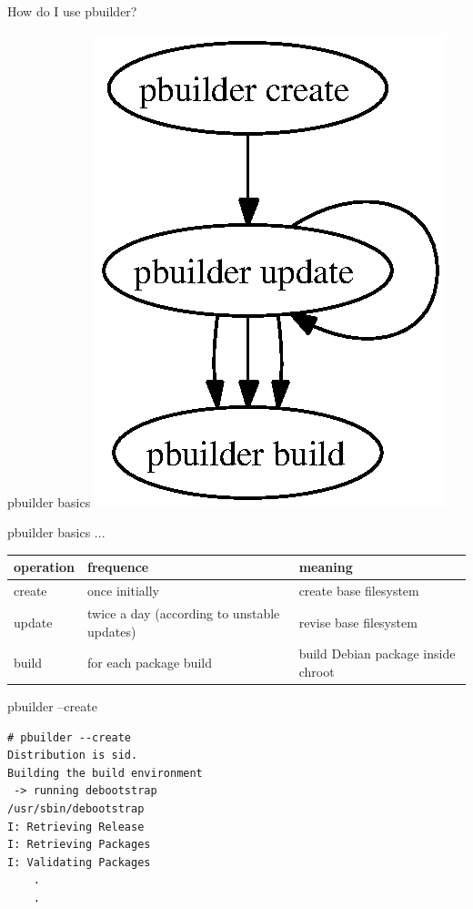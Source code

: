 \documentclass[dvipdfm,12pt,times]{beamer}
\newcommand{\emtext}[1]{
\begin{frame}{}
 
{\Huge #1
}
\end{frame}
}
\begin{document}
\emtext{How do I use pbuilder?}

\begin{frame}{pbuilder basics}
\includegraphics[height=0.7\vsize]{pbuildercycle.eps}
\end{frame}

\begin{frame}{pbuilder basics ...}
\begin{tabular}{|l|p{9em}|p{10em}|}
\hline
\hline
operation & frequence & meaning \\
\hline
\hline
create & once initially & create base filesystem \\
\hline
update & twice a day (according to unstable updates) & 
 revise base filesystem \\
\hline
build & for each package build & build Debian package inside chroot \\
\hline
\end{tabular}
\end{frame}

\begin{frame}[containsverbatim]{pbuilder --create}
\begin{verbatim}
# pbuilder --create
Distribution is sid.
Building the build environment
 -> running debootstrap
/usr/sbin/debootstrap
I: Retrieving Release
I: Retrieving Packages
I: Validating Packages
	.
	.
\end{verbatim}
\end{frame}
\end{document}
